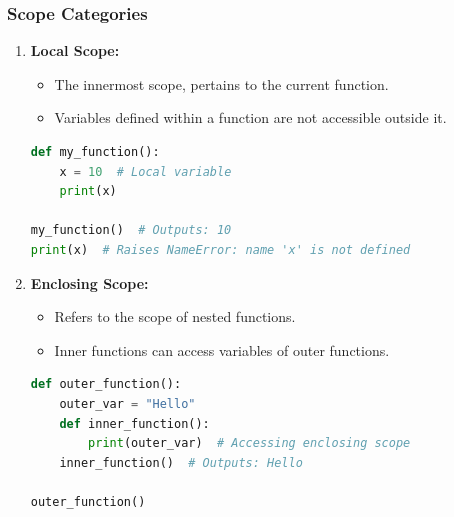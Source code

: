 \documentclass{beamer}
\begin{document}
\begin{frame}[fragile]
    \frametitle{Scope Categories}
    \begin{enumerate}
        \item \textbf{Local Scope:}
        \begin{itemize}
            \item The innermost scope, pertains to the current function.
            \item Variables defined within a function are not accessible outside it.
        \end{itemize}
        
        \begin{lstlisting}[language=Python]
def my_function():
    x = 10  # Local variable
    print(x)

my_function()  # Outputs: 10
print(x)  # Raises NameError: name 'x' is not defined
        \end{lstlisting}
        
        \item \textbf{Enclosing Scope:}
        \begin{itemize}
            \item Refers to the scope of nested functions.
            \item Inner functions can access variables of outer functions.
        \end{itemize}
        
        \begin{lstlisting}[language=Python]
def outer_function():
    outer_var = "Hello"
    def inner_function():
        print(outer_var)  # Accessing enclosing scope
    inner_function()  # Outputs: Hello
        
outer_function()
        \end{lstlisting}
    \end{enumerate}
\end{frame}
\end{document}

